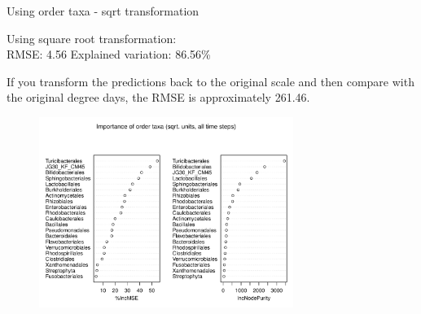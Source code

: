 \documentclass{beamer}
\begin{document}
\begin{frame}{Using order taxa - sqrt transformation}
  
  {\scriptsize
    
  \noindent Using square root transformation:\\
  RMSE: 4.56  \hspace{0.05in}  Explained variation: 86.56\%

  \vspace{0.05in}
  
  \noindent If you transform the predictions back to the original
  scale and then compare with the original degree days, the RMSE is
  approximately 261.46.
  
\begin{center}
\begin{figure}
  \includegraphics[width=3.25in]{../only_orders/all_time_steps/sqrt_units_all_data_orders_imp_plot}
\end{figure}
\end{center}
\vspace{-0.25in}
}
  
\end{frame}
\end{document}
